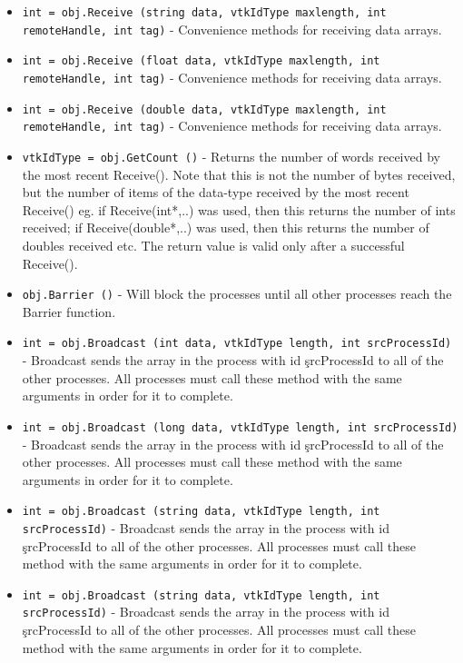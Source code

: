 \begin{itemize}
\item  \verb|int = obj.Receive (string data, vtkIdType maxlength, int remoteHandle, int tag)| -  Convenience methods for receiving data arrays.

\item  \verb|int = obj.Receive (float data, vtkIdType maxlength, int remoteHandle, int tag)| -  Convenience methods for receiving data arrays.

\item  \verb|int = obj.Receive (double data, vtkIdType maxlength, int remoteHandle, int tag)| -  Convenience methods for receiving data arrays.

\item  \verb|vtkIdType = obj.GetCount ()| -  Returns the number of words received by the most recent Receive().
 Note that this is not the number of bytes received, but the number of items
 of the data-type received by the most recent Receive() eg. if
 Receive(int*,..) was used, then this returns the number of ints received;
 if Receive(double*,..) was used, then this returns the number of doubles
 received etc. The return value is valid only after a successful Receive().

\item  \verb|obj.Barrier ()| -  Will block the processes until all other processes reach the Barrier
 function.

\item  \verb|int = obj.Broadcast (int data, vtkIdType length, int srcProcessId)| -  Broadcast sends the array in the process with id \c srcProcessId to all of
 the other processes.  All processes must call these method with the same
 arguments in order for it to complete.

\item  \verb|int = obj.Broadcast (long data, vtkIdType length, int srcProcessId)| -  Broadcast sends the array in the process with id \c srcProcessId to all of
 the other processes.  All processes must call these method with the same
 arguments in order for it to complete.

\item  \verb|int = obj.Broadcast (string data, vtkIdType length, int srcProcessId)| -  Broadcast sends the array in the process with id \c srcProcessId to all of
 the other processes.  All processes must call these method with the same
 arguments in order for it to complete.

\item  \verb|int = obj.Broadcast (string data, vtkIdType length, int srcProcessId)| -  Broadcast sends the array in the process with id \c srcProcessId to all of
 the other processes.  All processes must call these method with the same
 arguments in order for it to complete.


\end{itemize}

